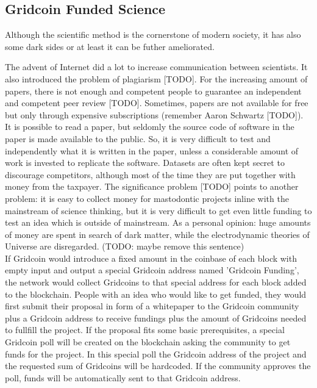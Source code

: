 \subsection{Gridcoin Funded Science}

Although the scientific method is the cornerstone of modern society, it has also some dark sides or at least it can be futher ameliorated. 

The advent of Internet did a lot to increase communication between scientists. It also introduced the problem of plagiarism [TODO]. For the increasing amount of papers, there is not enough and competent people to guarantee an independent and competent peer review [TODO]. Sometimes, papers are not available for free but only through expensive subscriptions (remember Aaron Schwartz [TODO]). It is possible to read a paper, but seldomly the source code of software in the paper is made available to the public. So, it is very difficult to test and independently what it is written in the paper, unless a considerable amount of work is invested to replicate the software. Datasets are often kept secret to discourage competitors, although most of the time they are put together with money from the taxpayer. The significance problem [TODO] points to another problem: it is easy to collect money for mastodontic projects inline with the mainstream of science thinking, but it is very difficult to get even little funding to test an idea which is outside of mainstream. As a personal opinion: huge amounts of money are spent in search of dark matter, while the electrodynamic theories of Universe are disregarded. (TODO: maybe remove this sentence)\\

If Gridcoin would introduce a fixed amount in the coinbase of each block with empty input and output a special Gridcoin address named 'Gridcoin Funding', the network would collect Gridcoins to that special address for each block added to the blockchain. People with an idea who would like to get funded, they would first submit their proposal in form of a whitepaper to the Gridcoin community plus a Gridcoin address to receive fundings plus the amount of Gridcoins needed to fullfill the project. If the proposal fits some basic prerequisites, a special Gridcoin poll will be created on the blockchain asking the community to get funds for the project. In this special poll the Gridcoin address of the project and the requested sum of Gridcoins will be hardcoded. If the community approves the poll, funds will be automatically sent to that Gridcoin address.\\

